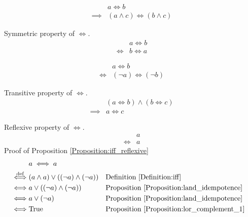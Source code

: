 \begin{prop}
\label{Proposition:iff_land}
\begin{align*}
& a \iff b \\
\implies & (a \land c) \iff (b \land c)
\end{align*}
\end{prop}

\begin{prop}
\label{Proposition:iff_symmetric}
Symmetric property of $\iff$.
\begin{align*}
& a \iff b \\
\iff & b \iff a
\end{align*}
\end{prop}

\begin{prop}
\label{Proposition:iff_contrapositive}
\begin{align*}
& a \iff b \\
\iff & (\lnot a) \iff (\lnot b)
\end{align*}
\end{prop}

\begin{prop}
\label{Proposition:iff_transitive}
Transitive property of $\iff$.
\begin{align*}
& (a \iff b) \land (b \iff c) \\
\implies & a \iff c
\end{align*}
\end{prop}

\begin{prop}
\label{Proposition:iff_reflexive}
Reflexive property of $\iff$.
\begin{align*}
& a \\
\iff & a
\end{align*}
Proof of Proposition \ref{Proposition:iff_reflexive}
\begin{align*}
& a \iff a \\
\overset{\operatorname{def}}{\iff} & (a \land a) \lor ((\lnot a) \land (\lnot a))
& & \text{Definition \ref{Definition:iff}} \\
\iff & a \lor ((\lnot a) \land (\lnot a))
& & \text{Proposition \ref{Proposition:land_idempotence}} \\
\iff & a \lor (\lnot a)
& & \text{Proposition \ref{Proposition:land_idempotence}} \\
\iff & \text{True}
& & \text{Proposition \ref{Proposition:lor_complement_1}} \\
\end{align*}
\end{prop}

